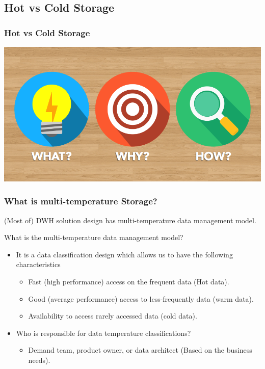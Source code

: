 \subsection{Hot vs Cold Storage}
\begin{frame}[c]
    \frametitle{Hot vs Cold Storage}

    \includegraphics[width=\textheight]{./Figures/chapter-01/WWH-Thumb.png}



\end{frame}


\begin{frame}
    \frametitle{What is multi-temperature Storage?}

    \begin{wideitemize}
		\item (Most of) DWH solution design has multi-temperature data management model.
		\item What is the multi-temperature data management model?
        \begin{itemize}[<+->]
			\item It is a data classification design which allows us to have the following characteristics
            \begin{itemize}[<+->]
				\item Fast (high performance) access on the frequent data (Hot data).
				\item Good (average performance) access to less-frequently data (warm data).
				\item Availability to access rarely accessed data (cold data).
	        \end{itemize}
			\item Who is responsible for data temperature classifications?
            \begin{itemize}[<+->]
			\item Demand team, product owner, or data architect (Based on the business needs).
	        \end{itemize}
		\end{itemize}
    \end{wideitemize}
\end{frame}

